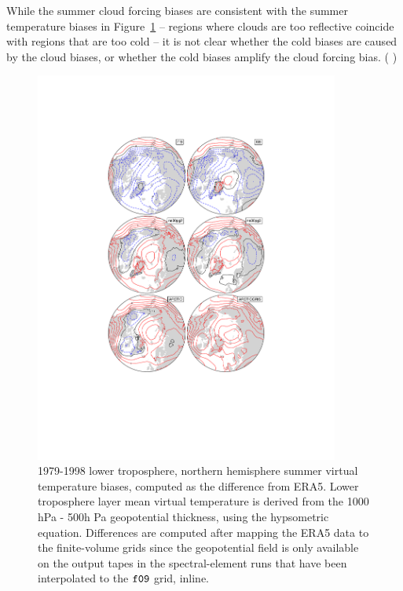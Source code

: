 \documentclass[draft]{agujournal2019}
\begin{document}
While the summer cloud forcing biases are consistent with the summer temperature biases in Figure~\ref{fig:dThyps} -- regions where clouds are too reflective coincide with regions that are too cold -- it is not clear whether the cold biases are caused by the cloud biases, or whether the cold biases amplify the cloud forcing bias. ({\color{blue}{This ends abruptly. Anything else to add?}} {\color{purple}{Causation I agree is hard to prove due to energy transport, but in summer cloud fraction is probably playing a role. The likely other thing that could be playing a role is surface albedo (absorbed solar). Could note that.}})

\begin{figure}[t]
\begin{center}
         \includegraphics[width=100mm]{figs/temp_contours_diffERA5_Thyps.pdf}
\end{center}
\caption{1979-1998 lower troposphere, northern hemisphere summer virtual temperature biases, computed as the difference from ERA5. Lower troposphere layer mean virtual temperature is derived from the 1000 hPa - 500h Pa geopotential thickness, using the hypsometric equation. Differences are computed after mapping the ERA5 data to the finite-volume grids since the geopotential field is only available on the output tapes in the spectral-element runs that have been interpolated to the $\tt f09$ grid, inline.}
\label{fig:dThyps}
\end{figure}
\end{document}
